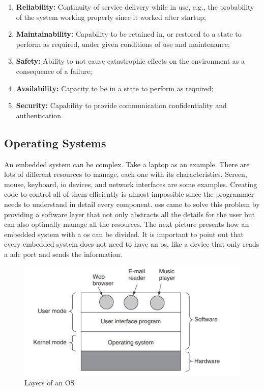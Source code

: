 \begin{enumerate}
    \item \textbf{Reliability:} Continuity of service delivery while in use, e.g., the probability of the system working properly since it 
	worked after startup;

    \item \textbf{Maintainability:} Capability to be retained in, or restored to a state to perform as required, under given conditions of 
	use and maintenance;

    \item \textbf{Safety:} Ability to not cause catastrophic effects on the environment as a consequence of a 
	failure;

    \item \textbf{Availability:} Capacity to be in a state to perform as required;
    
    \item \textbf{Security:} Capability to provide communication confidentiality and authentication.
    
\end{enumerate}


\subsection{Operating Systems}

An embedded system can be complex. Take a laptop as an example. There are lots of different resources to manage, each one with its 
characteristics. Screen, mouse, keyboard, \gls{io} devices, and network interfaces are some examples. Creating code to control all of them 
efficiently is almost impossible since the programmer needs to understand in detail every component. \glspl{os} came to solve this 
problem by providing a software layer that not only abstracts all the details for the user but can also optimally manage all the resources. 
The next picture presents how an embedded system with a \gls{os} can be divided. It is important to point out that every embedded system does 
not need to have an \gls{os}, like a device that only reads a \gls{adc} port and sends the information. 

\begin{figure}[H]
	\centering
 	\includegraphics[width=0.6\linewidth]{Images/OS_overview.png}
 	\caption{Layers of an OS \cite{OSbook} }
	 \label{fig_OSoverview}
\end{figure}

